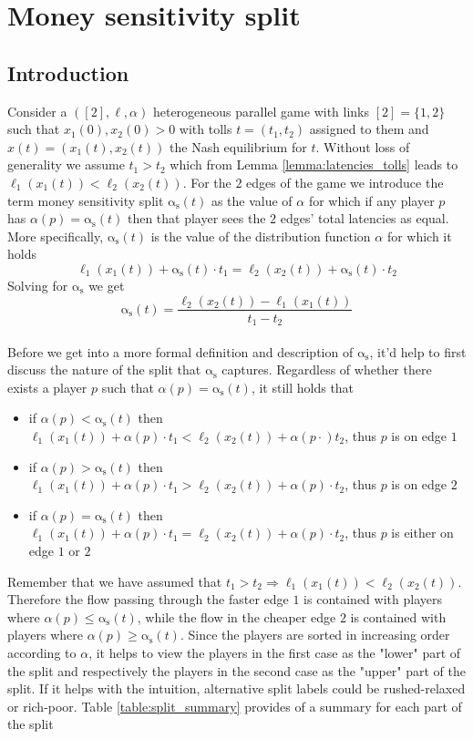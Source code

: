 \documentclass[10pt,a4paper]{book}
\newcommand{\as}{\mathrm{\alpha_s}}
\theoremstyle{definition}
\theoremstyle{comment}
\begin{document}
\chapter{Money sensitivity split}
\label{chapter:split}

\section{Introduction}

Consider a $([2], \ell, \alpha)$ heterogeneous parallel game with links $[2] = \{1, 2\}$ such that $x_1(0), x_2(0) > 0$ with tolls $t = (t_1, t_2)$ assigned to them and  $x(t) = (x_1(t), x_2(t))$ the Nash equilibrium for $t$.
Without loss of generality we assume $t_1 > t_2$ which from Lemma \ref{lemma:latencies_tolls} leads to $\ell_1(x_1(t)) < \ell_2(x_2(t))$.
For the $2$ edges of the game we introduce the term money sensitivity split $\as(t)$ as the value of $\alpha$ for which if any player $p$ has $\alpha(p)=\as(t)$ then that player sees the $2$ edges' total latencies as equal.
More specifically, $\as(t)$ is the value of the distribution function $\alpha$ for which it holds
\[\ell_1(x_1(t)) + \as(t) \cdot t_1 = \ell_2(x_2(t)) + \as(t) \cdot t_2\]
Solving for $\as$ we get
\[\as(t) = \frac{\ell_2(x_2(t)) - \ell_1(x_1(t))}{t_1 - t_2}\]
\\
Before we get into a more formal definition and description of $\as$, it'd help to first discuss the nature of the split that $\as$ captures.
Regardless of whether there exists a player $p$ such that $\alpha(p) = \as(t)$, it still holds that
\begin{itemize}
	\item if $\alpha(p) < \as(t)$ then $\ell_1(x_1(t)) + \alpha(p) \cdot t_1 < \ell_2(x_2(t)) + \alpha(p \cdot) t_2$, thus $p$ is on edge $1$
	\item if $\alpha(p) > \as(t)$ then $\ell_1(x_1(t)) + \alpha(p) \cdot t_1 > \ell_2(x_2(t)) + \alpha(p) \cdot t_2$, thus $p$ is on edge $2$
	\item if $\alpha(p) = \as(t)$ then $\ell_1(x_1(t)) + \alpha(p) \cdot t_1 = \ell_2(x_2(t)) + \alpha(p) \cdot t_2$, thus $p$ is either on edge $1$ or $2$
\end{itemize}
Remember that we have assumed that $t_1 > t_2 \Rightarrow \ell_1(x_1(t)) < \ell_2(x_2(t))$.
Therefore the flow passing through the faster edge $1$ is contained with players where $\alpha(p) \le \as(t)$, while the flow in the cheaper edge $2$ is contained with players where $\alpha(p) \ge \as(t)$.
Since the players are sorted in increasing order according to $\alpha$, it helps to view the players in the first case as the "lower" part of the split and respectively the players in the second case as the "upper" part of the split.
If it helps with the intuition, alternative split labels could be rushed-relaxed or rich-poor.
Table \autoref{table:split_summary} provides of a summary for each part of the split
\end{document}
